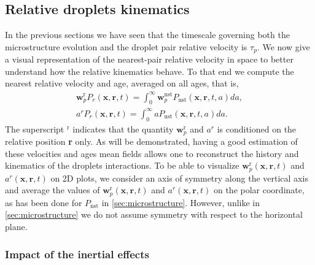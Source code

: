 \subsection{Relative droplets kinematics  }

In the previous sections we have seen that the timescale governing both the microstructure evolution and the droplet pair relative velocity is $\tau_p$.   
We now give a visual representation of the nearest-pair relative velocity in space to better understand how the relative kinematics   behave.  
To that end we compute the nearest relative velocity and age, averaged on all ages, that is,
\begin{align*}
    \textbf{w}^\text{r}_pP_r(\textbf{x},\textbf{r},t)
    =\int_0^\infty \textbf{w}^\text{nst}_pP_\text{nst}(\textbf{x},\textbf{r},t,a) da,\\
    a^rP_r(\textbf{x},\textbf{r},t)
    =\int_0^\infty a P_\text{nst}(\textbf{x},\textbf{r},t,a) da.
\end{align*}
The superscript $^\text{r}$ indicates that the quantity $\textbf{w}^\text{r}_p$ and $a^r$ is conditioned on the relative position \textbf{r} only.
As will be demonstrated, having a good estimation of these velocities and ages mean fields allows one to reconstruct the history and kinematics   of the droplets interactions. 
To be able to visualize
$\textbf{w}^\text{r}_p(\textbf{x},\textbf{r},t)$
and 
$a^r(\textbf{x},\textbf{r},t)$
on 2D plots, we consider an axis of symmetry along the vertical axis and average the values of 
$\textbf{w}^\text{r}_p(\textbf{x},\textbf{r},t)$
and $a^r(\textbf{x},\textbf{r},t)$
on the polar coordinate, as has been done for $P_\text{nst}$ in \ref{sec:microstructure}. 
However, unlike in \ref{sec:microstructure} we do not assume symmetry with respect to the horizontal plane. 

\subsubsection{Impact of the inertial effects}

